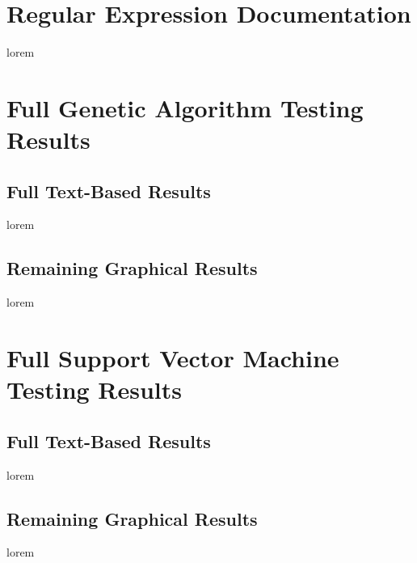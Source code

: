 \begin{appendices}

\chapter{Regular Expression Documentation}
lorem

\chapter{Full Genetic Algorithm Testing Results}


\section{Full Text-Based Results}
lorem
\section{Remaining Graphical Results}
lorem

\chapter{Full Support Vector Machine Testing Results}

\section{Full Text-Based Results}
lorem
\section{Remaining Graphical Results}
lorem







\end{appendices}

